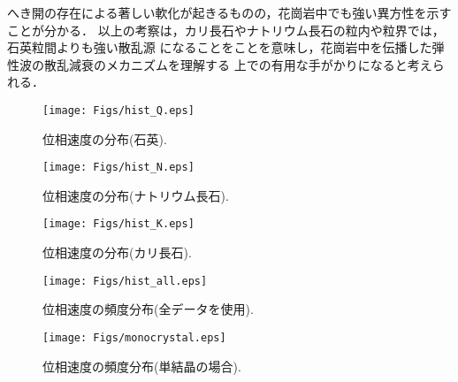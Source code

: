へき開の存在による著しい軟化が起きるものの，花崗岩中でも強い異方性を示すことが分かる．
以上の考察は，カリ長石やナトリウム長石の粒内や粒界では，石英粒間よりも強い散乱源
になることをことを意味し，花崗岩中を伝播した弾性波の散乱減衰のメカニズムを理解する
上での有用な手がかりになると考えられる．
\begin{figure}
\begin{center}
	\texttt{[image: Figs/hist\_Q.eps]}
	\caption{位相速度の分布(石英).}
	\label{fig:fig10}
\end{center}
	\vspace{-10mm}
\end{figure}
\begin{figure}
\begin{center}
	\texttt{[image: Figs/hist\_N.eps]}
	\caption{位相速度の分布(ナトリウム長石).}
	\label{fig:fig11}
\end{center}
	\vspace{-10mm}
\end{figure}
\begin{figure}
\begin{center}
	\texttt{[image: Figs/hist\_K.eps]}
	\caption{位相速度の分布(カリ長石).}
	\label{fig:fig12}
\end{center}
	\vspace{-10mm}
\end{figure}
\begin{figure}
\begin{center}
	\texttt{[image: Figs/hist\_all.eps]}
	\caption{位相速度の頻度分布(全データを使用).}
	\label{fig:fig13}
\end{center}
	\vspace{-10mm}
\end{figure}
\begin{figure}
\begin{center}
	\texttt{[image: Figs/monocrystal.eps]}
	\caption{位相速度の頻度分布(単結晶の場合).}
	\label{fig:fig14}
\end{center}
	\vspace{-10mm}
\end{figure}
